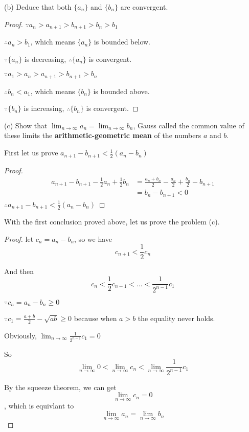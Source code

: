 \documentclass{article}
\begin{document}
    (b) Deduce that both $\{a_n\}$ and $\{b_n\}$ are convergent.

    \begin{proof}
        $\because a_n > a_{n+1} > b_{n+1} > b_n > b_1$

        $\therefore a_n > b_1$, which means $\{a_n\}$ is bounded below.

        $\because \{a_n\}$ is decreasing, $\therefore \{a_n\}$ is convergent.

        $\because a_1 > a_n > a_{n+1} > b_{n+1} > b_n$

        $\therefore b_n < a_1$, which means $\{b_n\}$ is bounded above.

        $\because \{b_n\}$ is increasing, $\therefore \{b_n\}$ is convergent.

    \end{proof}

    (c) Show that $\lim_{n \to \infty} a_n = \lim_{n \to \infty} b_n$, Gauss called the common value of these limits the \textbf{arithmetic-geometric mean} of the numbers $a$ and $b$.

    First let us prove $a_{n + 1} - b_{n + 1} < \frac 1 2(a_n - b_n)$

    \begin{proof}
        $$\begin{aligned}
            a_{n + 1} - b_{n + 1} - \frac 1 2 a_n + \frac 1 2 b_n &= \frac{a_n + b_n}{2} - \frac{a_n}{2} + \frac{b_n}{2} - b_{n+1} \\
            &= b_n - b_{n + 1} < 0
        \end{aligned}$$
        $\therefore a_{n + 1} - b_{n + 1} < \frac 1 2(a_n - b_n)$
    \end{proof}

    With the first conclusion proved above, let us prove the problem (c).
    \begin{proof}
        let $c_n = a_n - b_n$, so we have $$c_{n + 1} < \frac{1}{2}c_n$$

        And then $$c_n < \frac 1 2 c_{n - 1} < \dots < \frac{1}{2^{n - 1}}c_1$$

        $ \because c_n = a_n - b_n \ge 0$

        $\because c_1 = \frac{a + b}{2} - \sqrt{ab} \ge 0$ because when $a>b$ the equality never holds.
        
        Obviously, $\lim_{n \to \infty}\frac{1}{2^{n - 1}}c_1 = 0$

        So $$\lim_{n \to \infty} 0 < \lim_{n \to \infty}c_n < \lim_{n \to \infty}\frac{1}{2^{n - 1}}c_1$$

        By the squeeze theorem, we can get $$\lim_{n \to \infty}c_n = 0$$, which is equivlant to $$\lim_{n \to \infty}a_n = \lim_{n \to \infty}b_n$$
        
    \end{proof}
\end{document}
